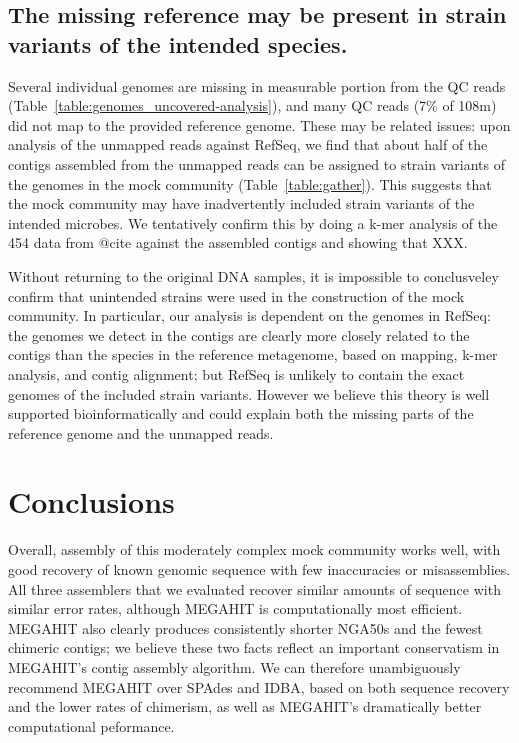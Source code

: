 \documentclass[10pt,a4paper,twocolumn]{article}
\begin{document}

\subsection*{The missing reference may be present in strain variants of the intended species.}

Several individual genomes are missing in measurable portion from the
QC reads (Table~\ref{table:genomes_uncovered-analysis}), and many QC
reads (7\% of 108m) did not map to the provided reference genome.
These may be related issues: upon analysis of the unmapped reads
against RefSeq, we find that about half of the contigs assembled from
the unmapped reads can be assigned to strain variants of the genomes
in the mock community (Table~\ref{table:gather}).  This suggests that
the mock community may have inadvertently included strain variants of
the intended microbes.  We tentatively confirm this by doing a k-mer
analysis of the 454 data from @cite against the assembled contigs and
showing that XXX.

Without returning to the original DNA samples, it is impossible to
conclusveley confirm that unintended strains were used in the
construction of the mock community.  In particular, our analysis is
dependent on the genomes in RefSeq: the genomes we detect in the
contigs are clearly more closely related to the contigs than the
species in the reference metagenome, based on mapping, k-mer analysis,
and contig alignment; but RefSeq is unlikely to contain the exact
genomes of the included strain variants.  However we believe this
theory is well supported bioinformatically and could explain both the
missing parts of the reference genome and the unmapped reads.


\section*{Conclusions}

Overall, assembly of this moderately complex mock community works
well, with good recovery of known genomic sequence with few
inaccuracies or misassemblies.  All three assemblers that we evaluated
recover similar amounts of sequence with similar error rates, although
MEGAHIT is computationally most efficient.  MEGAHIT also clearly
produces consistently shorter NGA50s and the fewest chimeric contigs;
we believe these two facts reflect an important conservatism in
MEGAHIT's contig assembly algorithm.  We can therefore unambiguously
recommend MEGAHIT over SPAdes and IDBA, based on both sequence
recovery and the lower rates of chimerism, as well as MEGAHIT's dramatically
better computational peformance.
\end{document}
